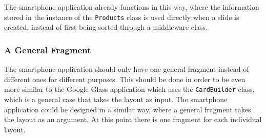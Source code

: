 The smartphone application already functions in this way, where the information stored in the instance of the \texttt{Products} class is used directly when a slide is created, instead of first being sorted through a middleware class.


\subsubsection{A General Fragment}
The smartphone application should only have one general fragment instead of different ones for different purposes. This should be done in order to be even more similar to the Google Glass application which uses the \texttt{CardBuilder} class, which is a general case that takes the layout as input. The smartphone application could be designed in a similar way, where a general fragment takes the layout as an argument. At this point there is one fragment for each individual layout.